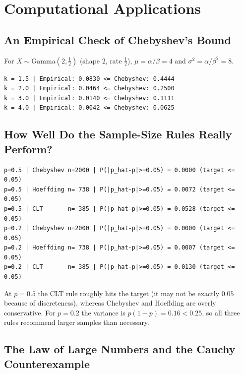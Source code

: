 \documentclass[main.tex]{subfiles}
\begin{document}
\section{Computational Applications}

\subsection{An Empirical Check of Chebyshev's Bound}
For $X\sim\text{Gamma}(2,\tfrac12)$ (shape $2$, rate $\tfrac12$), $\mu=\alpha/\beta=4$ and $\sigma^2=\alpha/\beta^2=8$.

\begin{lstlisting}[style=output]
k = 1.5 | Empirical: 0.0830 <= Chebyshev: 0.4444
k = 2.0 | Empirical: 0.0464 <= Chebyshev: 0.2500
k = 3.0 | Empirical: 0.0140 <= Chebyshev: 0.1111
k = 4.0 | Empirical: 0.0042 <= Chebyshev: 0.0625
\end{lstlisting}

\subsection{How Well Do the Sample-Size Rules Really Perform?}

\begin{lstlisting}[style=output]
p=0.5 | Chebyshev n=2000 | P(|p_hat-p|>=0.05) = 0.0000 (target <= 0.05)
p=0.5 | Hoeffding n= 738 | P(|p_hat-p|>=0.05) = 0.0072 (target <= 0.05)
p=0.5 | CLT       n= 385 | P(|p_hat-p|>=0.05) = 0.0528 (target <= 0.05)
p=0.2 | Chebyshev n=2000 | P(|p_hat-p|>=0.05) = 0.0000 (target <= 0.05)
p=0.2 | Hoeffding n= 738 | P(|p_hat-p|>=0.05) = 0.0007 (target <= 0.05)
p=0.2 | CLT       n= 385 | P(|p_hat-p|>=0.05) = 0.0130 (target <= 0.05)
\end{lstlisting}

At $p=0.5$ the CLT rule roughly hits the target (it may not be exactly $0.05$ because of discreteness), whereas Chebyshev and Hoeffding are overly conservative. For $p=0.2$ the variance is $p(1-p)=0.16<0.25$, so all three rules recommend larger samples than necessary.

\subsection{The Law of Large Numbers and the Cauchy Counterexample}
\end{document}
